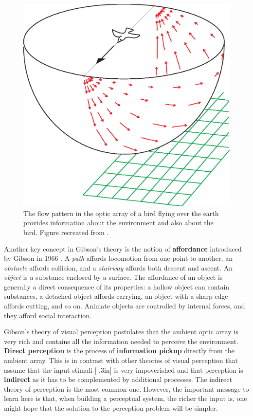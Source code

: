 \begin{figure}[t]
\centerline{
\includegraphics[width=0.7\linewidth]{figures/taxonomy/gibson_bird.eps}
} 
\caption{The flow pattern in the optic array of a bird flying over the earth provides information about the environment and also about the bird. Figure recreated from \cite{Gibson1966}.} 
\label{fig:gibson_bird}
\end{figure}

Another key concept in Gibson's theory is the notion of {\bf affordance} 
introduced by Gibson in 1966 \cite{Gibson1966}. A {\em path} affords locomotion from one point to another, an {\em obstacle} affords collision, and a {\em stairway} affords both descent and ascent. 
An {\em object} is a substance enclosed by a surface. The affordance of an object is generally a direct consequence of its properties: a hollow object can contain substances, a detached object affords carrying, an object with a sharp edge affords cutting, and so on. Animate objects are controlled by internal forces, and they afford social interaction. 


Gibson's theory of visual perception postulates that the ambient optic array is very rich and contains all the information needed to perceive the environment.  {\bf Direct perception} is the process of {\bf information pickup} directly from the ambient array. This is in contrast with other theories of visual perception that assume that the input stimuli
[-.3in] 
is very impoverished and that perception is {\bf indirect} as it has to be complemented by additional processes.
The indirect theory of perception is the most common one. However, the important message to learn here is that, when building a perceptual system, the richer the input is, one might hope that the solution to the perception problem will be simpler. 

